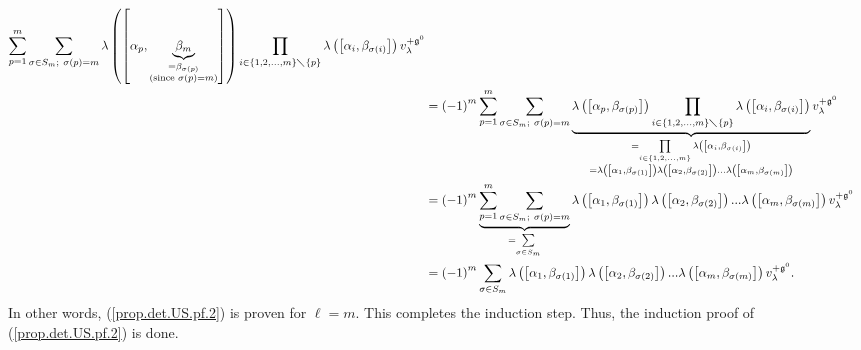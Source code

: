 \documentclass[etingof-lie.tex]{subfiles}
\begin{document}
\begin{align*}
\sum\limits_{p=1}^{m}\sum\limits_{\sigma\in S_{m};\ \sigma\left(  p\right)
=m}\lambda\left(  \left[  \alpha_{p},\underbrace{\beta_{m}}_{\substack{=\beta
_{\sigma\left(  p\right)  }\\\text{(since }\sigma\left(  p\right)  =m\text{)}%
}}\right]  \right)  \prod\limits_{i\in\left\{  1,2,...,m\right\}
\diagdown\left\{  p\right\}  }\lambda\left(  \left[  \alpha_{i},\beta
_{\sigma\left(  i\right)  }\right]  \right)  v_{\lambda}^{+\mathfrak{g}^{0}}\\
&  =\left(  -1\right)  ^{m}\sum\limits_{p=1}^{m}\sum\limits_{\sigma\in
S_{m};\ \sigma\left(  p\right)  =m}\underbrace{\lambda\left(  \left[
\alpha_{p},\beta_{\sigma\left(  p\right)  }\right]  \right)  \prod
\limits_{i\in\left\{  1,2,...,m\right\}  \diagdown\left\{  p\right\}  }%
\lambda\left(  \left[  \alpha_{i},\beta_{\sigma\left(  i\right)  }\right]
\right)  }_{\substack{=\prod\limits_{i\in\left\{  1,2,...,m\right\}  }%
\lambda\left(  \left[  \alpha_{i},\beta_{\sigma\left(  i\right)  }\right]
\right)  \\=\lambda\left(  \left[  \alpha_{1},\beta_{\sigma\left(  1\right)
}\right]  \right)  \lambda\left(  \left[  \alpha_{2},\beta_{\sigma\left(
2\right)  }\right]  \right)  ...\lambda\left(  \left[  \alpha_{m}%
,\beta_{\sigma\left(  m\right)  }\right]  \right)  }}v_{\lambda}%
^{+\mathfrak{g}^{0}}\\
&  =\left(  -1\right)  ^{m}\underbrace{\sum\limits_{p=1}^{m}\sum
\limits_{\sigma\in S_{m};\ \sigma\left(  p\right)  =m}}_{=\sum\limits_{\sigma
\in S_{m}}}\lambda\left(  \left[  \alpha_{1},\beta_{\sigma\left(  1\right)
}\right]  \right)  \lambda\left(  \left[  \alpha_{2},\beta_{\sigma\left(
2\right)  }\right]  \right)  ...\lambda\left(  \left[  \alpha_{m}%
,\beta_{\sigma\left(  m\right)  }\right]  \right)  v_{\lambda}^{+\mathfrak{g}%
^{0}}\\
&  =\left(  -1\right)  ^{m}\sum\limits_{\sigma\in S_{m}}\lambda\left(  \left[
\alpha_{1},\beta_{\sigma\left(  1\right)  }\right]  \right)  \lambda\left(
\left[  \alpha_{2},\beta_{\sigma\left(  2\right)  }\right]  \right)
...\lambda\left(  \left[  \alpha_{m},\beta_{\sigma\left(  m\right)  }\right]
\right)  v_{\lambda}^{+\mathfrak{g}^{0}}.
\end{align*}
In other words, (\ref{prop.det.US.pf.2}) is proven for $\ell=m$. This
completes the induction step. Thus, the induction proof of
(\ref{prop.det.US.pf.2}) is done.
\end{document}
